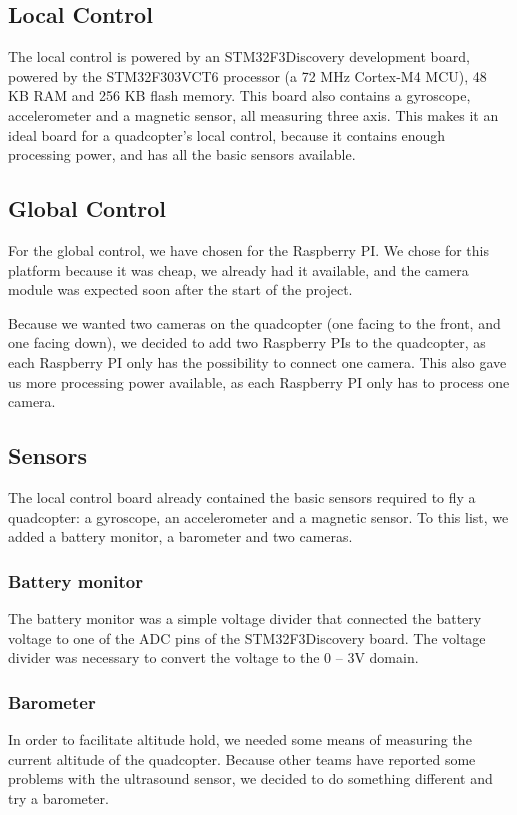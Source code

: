 \documentclass[11pt, a4paper, onecolumn, oneside, parskip=half]{scrartcl}
\begin{document}
\subsection{Local Control}
The local control is powered by an STM32F3Discovery development board, powered by the STM32F303VCT6 processor (a 72 MHz Cortex-M4 MCU), 48 KB RAM and 256 KB flash memory. This board also contains a gyroscope, accelerometer and a magnetic sensor, all measuring three axis. This makes it an ideal board for a quadcopter's local control, because it contains enough processing power, and has all the basic sensors available.

\subsection{Global Control}
For the global control, we have chosen for the Raspberry PI. We chose for this platform because it was cheap, we already had it available, and the camera module was expected soon after the start of the project.

Because we wanted two cameras on the quadcopter (one facing to the front, and one facing down), we decided to add two Raspberry PIs to the quadcopter, as each Raspberry PI only has the possibility to connect one camera. This also gave us more processing power available, as each Raspberry PI only has to process one camera.

\subsection{Sensors}
The local control board already contained the basic sensors required to fly a quadcopter: a gyroscope, an accelerometer and a magnetic sensor. To this list, we added a battery monitor, a barometer and two cameras.

\subsubsection{Battery monitor}
The battery monitor was a simple voltage divider that connected the battery voltage to one of the ADC pins of the STM32F3Discovery board. The voltage divider was necessary to convert the voltage to the 0 -- 3V domain.

\subsubsection{Barometer}
In order to facilitate altitude hold, we needed some means of measuring the current altitude of the quadcopter. Because other teams have reported some problems with the ultrasound sensor, we decided to do something different and try a barometer.
\end{document}
